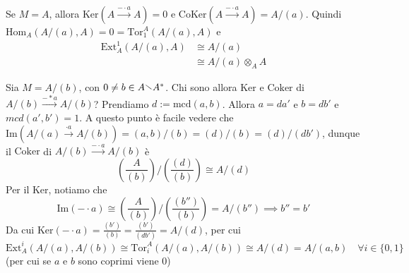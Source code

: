 \begin{example}{}
    Se \(M = A\), allora \(\mathrm{Ker}{(A \overset{-\cdot a}{\to} A)} = 0\) e
    \(\mathrm{CoKer}{(A \overset{-\cdot a}{\to} A)} = A / {(a)}\). Quindi
    \(\mathrm{Hom}_A{(A/{(a)}, A)} = 0 = \mathrm{Tor}_1^{A}{(A / {(a)}, A)}\) e
        \begin{align*}
            \mathrm{Ext}^{1}_A{(A / {(a)}, A)} &\cong A /{(a)} \\
            &\cong A / {(a)} \otimes_A A
        \end{align*}

    Sia \(M = A / {(b)}\), con \(0 \neq b \in A \sminus A^{*}\).
    Chi sono allora \(\mathrm{Ker}\) e \(\mathrm{Coker}\) di \(A / {(b)}
    \overset{-*a}{\to} A / {(b)}\)? Prendiamo \(d := \mathrm{mcd}{(a, b)}\).
    Allora \(a = da'\) e \(b = db'\) e \(mcd{(a', b')} = 1\). A questo punto è
    facile vedere che \(\mathrm{Im}{\left( A / {(a)} \overset{\cdot a}{\to} A /
    {(b)}\right)} = {(a,b)}/{(b)} = {(d)}/{(b)} = {(d)}/{(db')}\), dunque il
    \(\mathrm{Coker}\) di \(A/{(b)} \overset{-\cdot a}{\to} A/{(b)}\) è 
    \[
      {\left( \frac{A}{{(b)}} \right)} / {\left( \frac{{(d)}}{{(b)}} \right)} \cong A /
      {(d)}
    \]
    Per il Ker, notiamo che
    \[
        \mathrm{Im} {(- \cdot a)} \cong {\left( \frac{A}{{(b)}} \right)} /
        {\left( \frac{{(b'')}}{{(b)}} \right)} = A / {(b'')} \implies b'' = b'
    \]
    Da cui \(\mathrm{Ker}{(- \cdot a)} = \frac{{(b')}}{{(b)}} =
    \frac{{(b')}}{{(db')}} = A / {(d)}\), per cui
    \[
      \mathrm{Ext}_A^{i}{\left( A / {(a)}, A / {(b)} \right)} \cong
      \mathrm{Tor}_i^{A}{\left( A / {(a)}, A / {(b)} \right)} \cong A / {(d)} =
      A / {(a, b)} \quad \forall i \in \{0, 1\} 
    \]
    (per cui se \(a\) e \(b\) sono coprimi viene 0)
\end{example}

